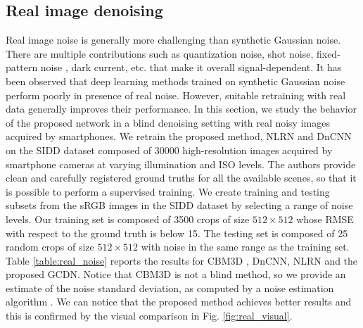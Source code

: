 \documentclass[journal]{IEEEtran}
\begin{document}
\subsection{Real image denoising}
Real image noise is generally more challenging than synthetic Gaussian noise. There are multiple contributions such as quantization noise, shot noise, fixed-pattern noise \cite{holst1998ccd,lukavs2006digital}, dark current, etc. that make it overall signal-dependent. It has been observed \cite{plotz2017benchmarking,SIDD_2018_CVPR} that deep learning methods trained on synthetic Gaussian noise perform poorly in presence of real noise. However, suitable retraining with real data generally improves their performance. In this section, we study the behavior of the proposed network in a blind denoising setting with real noisy images acquired by smartphones. We retrain the proposed method, NLRN and DnCNN on the SIDD dataset \cite{SIDD_2018_CVPR} composed of 30000 high-resolution images acquired by smartphone cameras at varying illumination and ISO levels. The authors provide clean and carefully registered ground truths for all the available scenes, so that it is possible to perform a supervised training. We create training and testing subsets from the sRGB images in the SIDD dataset by selecting a range of noise levels. Our training set is composed of 3500 crops of size $512 \times 512$ whose RMSE with respect to the ground truth is below 15. The testing set is composed of 25 random crops of size $512 \times 512$ with noise in the same range as the training set. Table \ref{table:real_noise} reports the results for CBM3D \cite{dabov2007color}, DnCNN, NLRN and the proposed GCDN. Notice that CBM3D is not a blind method, so we provide an estimate of the noise standard deviation, as computed by a noise estimation algorithm \cite{Chen2015Efficient}.
We can notice that the proposed method achieves better results and this is confirmed by the visual comparison in Fig. \ref{fig:real_visual}.
\end{document}
